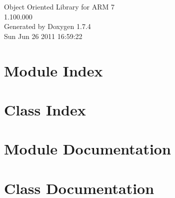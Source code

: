 \documentclass[a4paper]{book}
\begin{document}
\hypersetup{pageanchor=false}
\begin{titlepage}
\vspace*{7cm}
\begin{center}
{\Large Object Oriented Library for ARM 7 \\[1ex]\large 1.100.000 }\\
\vspace*{1cm}
{\large Generated by Doxygen 1.7.4}\\
\vspace*{0.5cm}
{\small Sun Jun 26 2011 16:59:22}\\
\end{center}
\end{titlepage}
\clearemptydoublepage
{}
\tableofcontents
\clearemptydoublepage
{}
\hypersetup{pageanchor=true}
\chapter{Module Index}

\chapter{Class Index}

\chapter{Module Documentation}









\chapter{Class Documentation}



















\printindex
\end{document}

